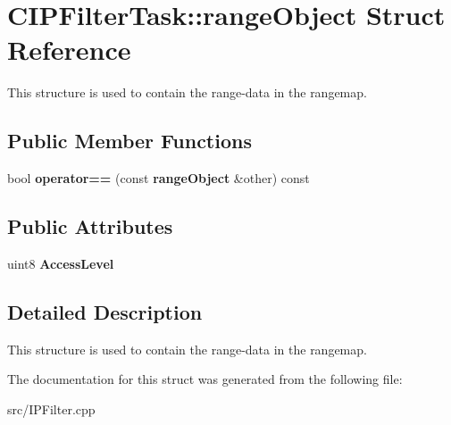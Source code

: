 \section{CIPFilterTask::rangeObject Struct Reference}
\label{structCIPFilterTask_1_1rangeObject}


This structure is used to contain the range-\/data in the rangemap.  
\subsection*{Public Member Functions}
\begin{DoxyCompactItemize}
\item 
bool {\bfseries operator==} (const {\bf rangeObject} \&other) const \label{structCIPFilterTask_1_1rangeObject_ae4f9196750fb5055a5576c4e3d1c11b7}

\end{DoxyCompactItemize}
\subsection*{Public Attributes}
\begin{DoxyCompactItemize}
\item 
uint8 {\bf AccessLevel}\label{structCIPFilterTask_1_1rangeObject_a27251e213306c9daecb245b058031560}

\end{DoxyCompactItemize}


\subsection{Detailed Description}
This structure is used to contain the range-\/data in the rangemap. 

The documentation for this struct was generated from the following file:\begin{DoxyCompactItemize}
\item 
src/IPFilter.cpp\end{DoxyCompactItemize}
